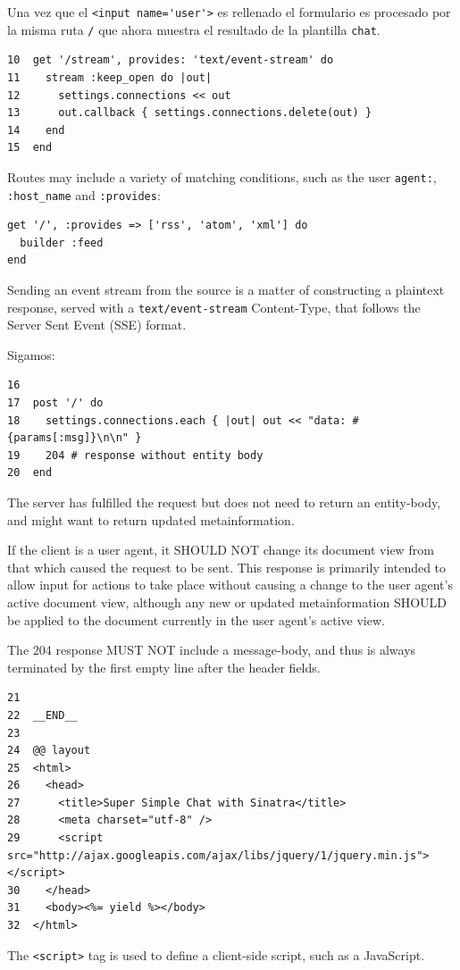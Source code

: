 Una vez que el \verb|<input name='user'>| es rellenado el formulario es procesado por la misma
ruta \verb|/| que ahora muestra el resultado de la plantilla \verb|chat|. 
\begin{verbatim}
10  get '/stream', provides: 'text/event-stream' do
11    stream :keep_open do |out|
12      settings.connections << out
13      out.callback { settings.connections.delete(out) }
14    end
15  end
\end{verbatim}
Routes may include a variety of matching conditions, such as the user \verb|agent:|,
\verb|:host_name| and \verb|:provides|:
\begin{verbatim}
get '/', :provides => ['rss', 'atom', 'xml'] do
  builder :feed
end
\end{verbatim}
Sending an event stream from the source is a matter of constructing
a plaintext response, served with a \verb|text/event-stream| Content-Type,
that follows the Server Sent Event (SSE) format. 

Sigamos:
\begin{verbatim}
16  
17  post '/' do
18    settings.connections.each { |out| out << "data: #{params[:msg]}\n\n" }
19    204 # response without entity body
20  end
\end{verbatim}


The server has fulfilled the request but does not need to return
an entity-body, and might want to return updated metainformation.

If the client is a user agent, it SHOULD NOT change its document
view from that which caused the request to be sent. This response
is primarily intended to allow input for actions to take place
without causing a change to the user agent's active document view,
although any new or updated metainformation SHOULD be applied to
the document currently in the user agent's active view.

The 204 response MUST NOT include a message-body, and thus is always
terminated by the first empty line after the header fields.
\begin{verbatim}
21  
22  __END__
23  
24  @@ layout
25  <html>
26    <head> 
27      <title>Super Simple Chat with Sinatra</title> 
28      <meta charset="utf-8" />
29      <script src="http://ajax.googleapis.com/ajax/libs/jquery/1/jquery.min.js"></script> 
30    </head> 
31    <body><%= yield %></body>
32  </html>
\end{verbatim}

The \verb|<script>| tag is used to define a client-side script, such as a JavaScript.

